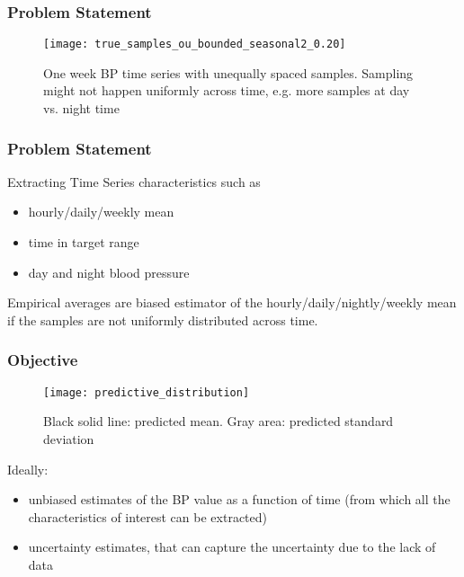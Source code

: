 \documentclass[
	9pt, %
]{beamer}
\begin{document}


\begin{frame}
	\frametitle{Problem Statement}

		\begin{figure}
				\texttt{[image: true\_samples\_ou\_bounded\_seasonal2\_0.20]}
				\caption{One week BP time series with unequally spaced samples. Sampling might not happen
				uniformly across time, e.g. more samples at day vs. night time}
		\end{figure}

\end{frame}


\begin{frame}
	\frametitle{Problem Statement}

		Extracting Time Series characteristics such as
		\begin{itemize}
		\item hourly/daily/weekly mean
		\item time in target range
		\item day and night blood pressure
		\end{itemize}

	\bigskip %

	Empirical averages are biased estimator of the hourly/daily/nightly/weekly mean if
	the samples are not uniformly distributed across time.

\end{frame}


\begin{frame}
	\frametitle{Objective}

		\begin{figure}
				\texttt{[image: predictive\_distribution]}
				\caption{Black solid line: predicted mean. Gray area: predicted standard deviation}
		\end{figure}

	Ideally:
	\begin{itemize}
		\item unbiased estimates of the BP value as a function of time (from which all the
		characteristics of interest can be extracted)
		\item uncertainty estimates, that can capture the uncertainty due to the lack of data
	\end{itemize}
\end{frame}
\end{document}
